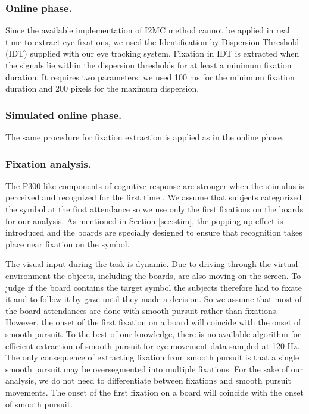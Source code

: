 \documentclass[12pt]{iopart}
\begin{document}
\subsubsection*{Online phase.}
Since the available implementation of I2MC method cannot be applied 
in real time to extract eye fixations,
we used the Identification by Dispersion-Threshold (IDT) 
supplied with our eye tracking system. Fixation in IDT is extracted
when the signals lie within the dispersion thresholds for at least a minimum fixation duration.
It requires two parameters: we used 100 ms for the minimum fixation duration
and 200 pixels for the maximum dispersion.

\subsubsection*{Simulated online phase.}
The same procedure for fixation extraction is applied as in the online phase.

\subsubsection*{Fixation analysis.}
\label{sec:fixanal}
The P300-like components of cognitive response are stronger when the stimulus is perceived and recognized
for the first time \cite{devillez_p300_2015}. 
We assume that subjects categorized the symbol at the first
attendance so we use only the first fixations on the boards for our analysis.
As mentioned in Section \ref{sec:stim}, the popping up effect is introduced 
and the boards are specially designed to ensure that
recognition takes place near fixation on the symbol.

The visual input during the task is dynamic. Due to driving through
the virtual environment the objects, including the boards, are also moving on the screen. To judge if the board contains the target symbol the subjects therefore had to fixate it and to follow it by gaze until they made a decision.
So we assume that most of the board attendances are done with
smooth pursuit rather than fixations. However, the onset of the first fixation on a board will coincide with the onset of smooth pursuit.
To the best of our knowledge, there is no available algorithm for efficient
extraction of smooth pursuit for eye movement data sampled at 120 Hz.
The only consequence of 
extracting fixation from smooth pursuit is that a single smooth pursuit
may be oversegmented into multiple fixations.
For the sake of our analysis, we do not need to differentiate between
fixations and smooth pursuit movements. The onset of the first fixation on a board
will coincide with the onset of smooth pursuit.
\end{document}
